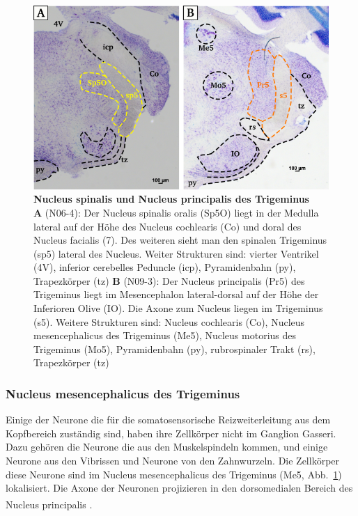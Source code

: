 \documentclass[12pt,a4paper,pdftex]{article}
\begin{document}
\begin{figure}[H]
    \centering
    \includegraphics[width = \textwidth]
    {pictures/somatosensory/somato_kopf.png}
    \caption[Nucleus spinalis und Nucleus principalis des Trigeminus]{\textbf{Nucleus spinalis und Nucleus principalis des Trigeminus}\\
     \textbf{A} (N06-4): Der Nucleus spinalis oralis (Sp5O) liegt in der Medulla lateral auf der Höhe des Nucleus cochlearis (Co) und doral des Nucleus facialis (7). Des weiteren sieht man den spinalen Trigeminus (sp5) lateral des Nucleus. Weiter Strukturen sind: vierter Ventrikel (4V), inferior cerebelles Peduncle (icp), Pyramidenbahn (py), Trapezkörper (tz)
     \textbf{B} (N09-3): Der Nucleus principalis (Pr5) des Trigeminus liegt im Mesencephalon lateral-dorsal auf der Höhe der Inferioren Olive (IO). Die Axone zum Nucleus liegen im Trigeminus (s5). Weitere Strukturen sind: Nucleus cochlearis (Co), Nucleus mesencephalicus des Trigeminus (Me5), Nucleus motorius des Trigeminus (Mo5),  Pyramidenbahn (py), rubrospinaler Trakt (rs), Trapezkörper (tz)}
    \label{fig:somato_Pr5}
\end{figure}

\subsubsection*{Nucleus mesencephalicus des Trigeminus}
Einige der Neurone die für die somatosensorische Reizweiterleitung aus dem Kopfbereich zuständig sind, haben ihre Zellkörper nicht im Ganglion Gasseri. Dazu gehören die Neurone die aus den Muskelspindeln kommen, und einige Neurone aus den Vibrissen und Neurone von den Zahnwurzeln. Die Zellkörper diese Neurone sind im Nucleus mesencephalicus des Trigeminus (Me5, Abb.~\ref{fig:somato_Pr5}) lokalisiert. Die Axone der Neuronen projizieren in den dorsomedialen Bereich des Nucleus principalis  \textsuperscript{\cite[5]{heldmaier2003tierphysiologie}}.
\end{document}
